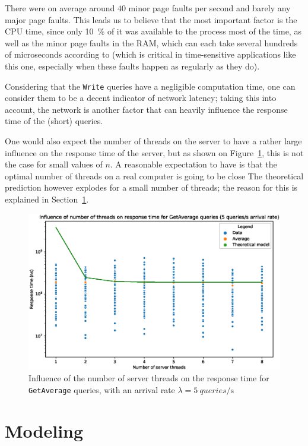 \documentclass[journal]{IEEEtran}
\theoremstyle{definition}
\newcommand{\java}[1]{\texttt{#1}}
\begin{document}
There were on average around \(40\) minor page faults per second and barely any major page faults.
This leads us to believe that the most important factor is the CPU time, since only \SI{10}{\percent} of it was available to the process most of the time, as well as the minor page faults in the RAM, which can each take several hundreds of microseconds according to \cite{pagefault} (which is critical in time-sensitive applications like this one, especially when these faults happen as regularly as they do).

Considering that the \java{Write} queries have a negligible computation time, one can consider them to be a decent indicator of network latency; taking this into account, the network is another factor that can heavily influence the response time of the (short) queries.

One would also expect the number of threads on the server to have a rather large influence on the response time of the server, but as shown on Figure~\ref{fig:thread_influence}, this is not the case for small values of \(n\).
A reasonable expectation to have is that the optimal number of threads on a real computer is going to be close 
The theoretical prediction however explodes for a small number of threads; the reason for this is explained in Section~\ref{sec:task2}.
\begin{figure}[!hbtp]
	\centering
	\includegraphics[width=\columnwidth]{../plotting/thread_influence}
	\caption{Influence of the number of server threads on the response time for \java{GetAverage} queries, with an arrival rate \(\lambda = \SI{5}{queries\per\second}\)}
	\label{fig:thread_influence}
\end{figure}

\section{Modeling}
\label{sec:task2}
\end{document}
